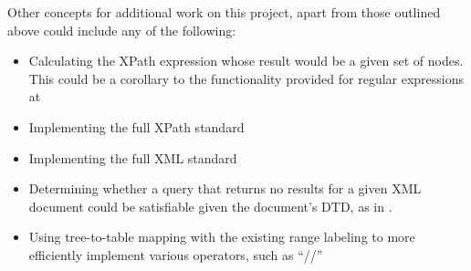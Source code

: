 \documentclass{acm_proc_article-sp}
\begin{document}
Other concepts for additional work on this project, apart from those outlined above could include any of the following:
\begin{itemize}
\item Calculating the XPath expression whose result would be a given set of nodes. This could be a corollary to the functionality provided for regular expressions at \cite{regex} 
\item Implementing the full XPath standard
\item Implementing the full XML standard
\item Determining whether a query that returns no results for a given XML document could be satisfiable given the document's DTD, as in \cite{benedikt:satisfiability}.
\item Using tree-to-table mapping with the existing range labeling to more efficiently implement various operators, such as ``//''
\end{itemize}





\nocite{xpathtokenizer}



\end{document}

